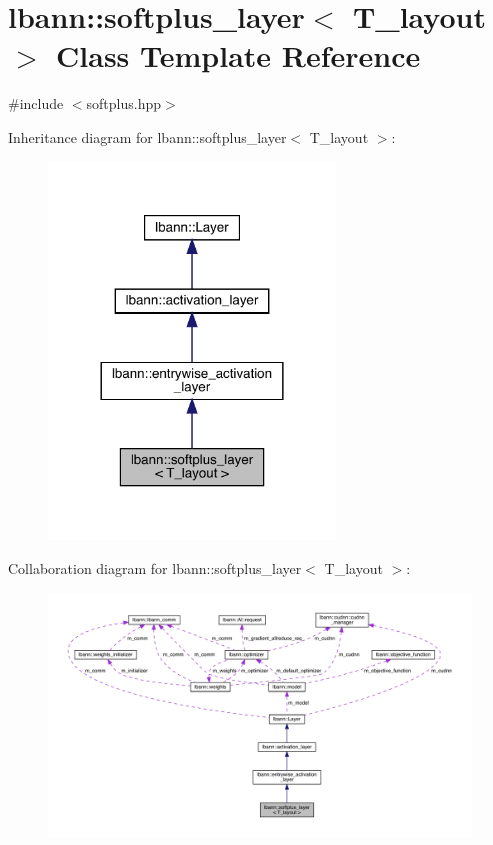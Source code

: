 \hypertarget{classlbann_1_1softplus__layer}{}\section{lbann\+:\+:softplus\+\_\+layer$<$ T\+\_\+layout $>$ Class Template Reference}
\label{classlbann_1_1softplus__layer}


{\ttfamily \#include $<$softplus.\+hpp$>$}



Inheritance diagram for lbann\+:\+:softplus\+\_\+layer$<$ T\+\_\+layout $>$\+:\nopagebreak
\begin{figure}[H]
\begin{center}
\leavevmode
\includegraphics[width=216pt]{classlbann_1_1softplus__layer__inherit__graph}
\end{center}
\end{figure}


Collaboration diagram for lbann\+:\+:softplus\+\_\+layer$<$ T\+\_\+layout $>$\+:\nopagebreak
\begin{figure}[H]
\begin{center}
\leavevmode
\includegraphics[width=350pt]{classlbann_1_1softplus__layer__coll__graph}
\end{center}
\end{figure}
